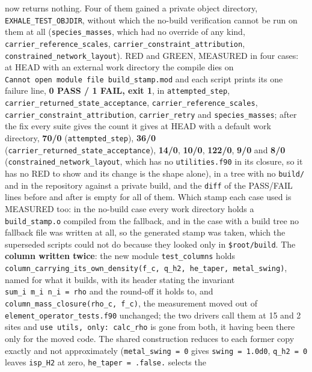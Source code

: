 \documentclass[english,a4paper]{my_memo}
\begin{document}
\begin{itemize}
  now returns nothing. Four of them gained a private object directory,
  \texttt{EXHALE\_TEST\_OBJDIR}, without which the no-build verification cannot be run
  on them at all (\texttt{species\_masses}, which had no override of any kind,
  \texttt{carrier\_reference\_scales}, \texttt{carrier\_constraint\_attribution},
  \texttt{constrained\_network\_layout}). RED and GREEN, MEASURED in four cases: at HEAD
  with an external work directory the compile dies on \texttt{Cannot\ open\ module\ file\ \textquotesingle{}build\_stamp.mod\textquotesingle{}} and each script prints its one failure line, \textbf{0 PASS / 1
  FAIL, exit 1}, in \texttt{attempted\_step}, \texttt{carrier\_returned\_state\_acceptance},
  \texttt{carrier\_reference\_scales}, \texttt{carrier\_constraint\_attribution},
  \texttt{carrier\_retry} and \texttt{species\_masses}; after the fix every suite gives the
  count it gives at HEAD with a default work directory, \textbf{70/0}
  (\texttt{attempted\_step}), \textbf{36/0} (\texttt{carrier\_returned\_state\_acceptance}),
  \textbf{14/0}, \textbf{10/0}, \textbf{122/0}, \textbf{9/0} and \textbf{8/0}
  (\texttt{constrained\_network\_layout}, which has no \texttt{utilities.f90} in its closure,
  so it has no RED to show and its change is the shape alone), in a tree with
  no \texttt{build/} and in the repository against a private build, and the \texttt{diff} of
  the PASS/FAIL lines before and after is empty for all of them. Which stamp
  each case used is MEASURED too: in the no-build case every work directory
  holds a \texttt{build\_stamp.o} compiled from the fallback, and in the case with a
  build tree no fallback file was written at all, so the generated stamp was
  taken, which the superseded scripts could not do because they looked only in
  \texttt{\$root/build}. The \textbf{column written twice}: the new module \texttt{test\_columns}
  holds \texttt{column\_carrying\_its\_own\_density(f\_c,\ q\_h2,\ he\_taper,\ metal\_swing)},
  named for what it builds, with its header stating the invariant
  \texttt{sum\_i\ m\_i\ n\_i\ =\ rho} and the round-off it holds to, and
  \texttt{column\_mass\_closure(rho\_c,\ f\_c)}, the measurement moved out of
  \texttt{element\_operator\_tests.f90} unchanged; the two drivers call them at 15 and 2
  sites and \texttt{use\ utils,\ only:\ calc\_rho} is gone from both, it having been there
  only for the moved code. The shared construction reduces to each former copy
  exactly and not approximately (\texttt{metal\_swing\ =\ 0} gives \texttt{swing\ =\ 1.0d0},
  \texttt{q\_h2\ =\ 0} leaves \texttt{isp\_H2} at zero, \texttt{he\_taper\ =\ .false.} selects the

\end{itemize}
\end{document}
